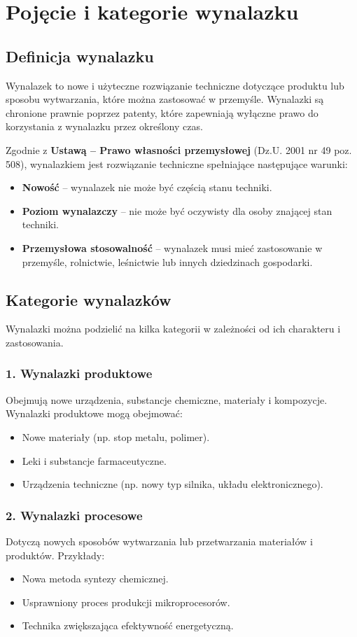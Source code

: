 \section{Pojęcie i kategorie wynalazku}

\subsection{Definicja wynalazku}
Wynalazek to nowe i użyteczne rozwiązanie techniczne dotyczące produktu lub sposobu wytwarzania, które można zastosować w przemyśle. Wynalazki są chronione prawnie poprzez patenty, które zapewniają wyłączne prawo do korzystania z wynalazku przez określony czas.

Zgodnie z \textbf{Ustawą – Prawo własności przemysłowej} (Dz.U. 2001 nr 49 poz. 508), wynalazkiem jest rozwiązanie techniczne spełniające następujące warunki:
\begin{itemize}
    \item \textbf{Nowość} – wynalazek nie może być częścią stanu techniki.
    \item \textbf{Poziom wynalazczy} – nie może być oczywisty dla osoby znającej stan techniki.
    \item \textbf{Przemysłowa stosowalność} – wynalazek musi mieć zastosowanie w przemyśle, rolnictwie, leśnictwie lub innych dziedzinach gospodarki.
\end{itemize}

\subsection{Kategorie wynalazków}
Wynalazki można podzielić na kilka kategorii w zależności od ich charakteru i zastosowania.

\subsubsection{1. Wynalazki produktowe}
Obejmują nowe urządzenia, substancje chemiczne, materiały i kompozycje. Wynalazki produktowe mogą obejmować:
\begin{itemize}
    \item Nowe materiały (np. stop metalu, polimer).
    \item Leki i substancje farmaceutyczne.
    \item Urządzenia techniczne (np. nowy typ silnika, układu elektronicznego).
\end{itemize}

\subsubsection{2. Wynalazki procesowe}
Dotyczą nowych sposobów wytwarzania lub przetwarzania materiałów i produktów. Przykłady:
\begin{itemize}
    \item Nowa metoda syntezy chemicznej.
    \item Usprawniony proces produkcji mikroprocesorów.
    \item Technika zwiększająca efektywność energetyczną.
\end{itemize}


